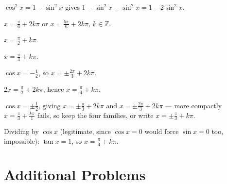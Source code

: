 \begin{solutions}
        $\cos^{2}x=1-\sin^{2}x$ gives $1-\sin^{2}x-\sin^{2}x
        =1-2\sin^{2}x$.
  \item $x=\tfrac{\pi}{6}+2k\pi$ or $x=\tfrac{5\pi}{6}+2k\pi$,
        $k\in\mathbb{Z}$.
  \item $x=\tfrac{\pi}{2}+k\pi$.
  \item $x=\tfrac{\pi}{4}+k\pi$.
  \item $\cos x=-\tfrac12$, so
        $x=\pm\tfrac{2\pi}{3}+2k\pi$.
  \item $2x=\tfrac{\pi}{2}+2k\pi$, hence
        $x=\tfrac{\pi}{4}+k\pi$.
  \item $\cos x=\pm\tfrac12$, giving
        $x=\pm\tfrac{\pi}{3}+2k\pi$ and $x=\pm\tfrac{2\pi}{3}+2k\pi$ ---
        more compactly $x=\tfrac{\pi}{3}+\tfrac{k\pi}{1}$ fails, so keep
        the four families, or write
        $x=\pm\tfrac{\pi}{3}+k\pi$.
  \item Dividing by $\cos x$ (legitimate, since $\cos x=0$ would force
        $\sin x=0$ too, impossible): $\tan x=1$, so
        $x=\tfrac{\pi}{4}+k\pi$.
\end{solutions}

\section{Additional Problems}

